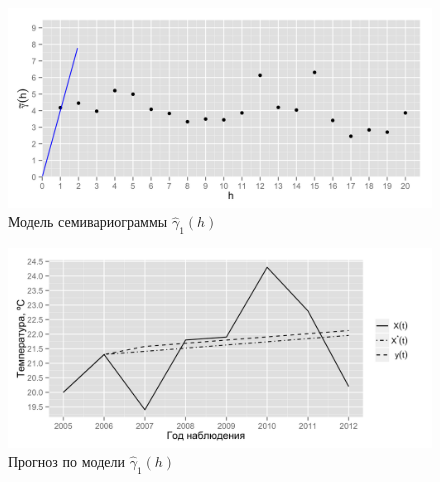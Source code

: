\documentclass[notheorems]{beamer}
\theoremstyle{definition}
\theoremstyle{example}
\theoremstyle{plain}
\begin{document}
\begin{frame}
\begin{columns}[c]
  \vspace{-14.5pt}
  \begin{figure}[H]
    \includegraphics[width=0.9\linewidth]{../../figures/variogram/lin-modeled.png} \\
    \caption{Модель семивариограммы $\widehat{\gamma}_1(h)$}
    \includegraphics[width=0.9\linewidth]{../../figures/variogram/lin-cross-prediction.png}
    \caption{Прогноз по модели $\widehat{\gamma}_1(h)$}
  \end{figure}
  \end{columns}
\end{frame}


\end{document}
